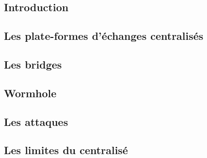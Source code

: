 \subsection{Introduction}


\subsection{Les plate-formes d'échanges centralisés}


\subsection{Les bridges}


\subsection{Wormhole}


\subsection{Les attaques}


\subsection{Les limites du centralisé}
